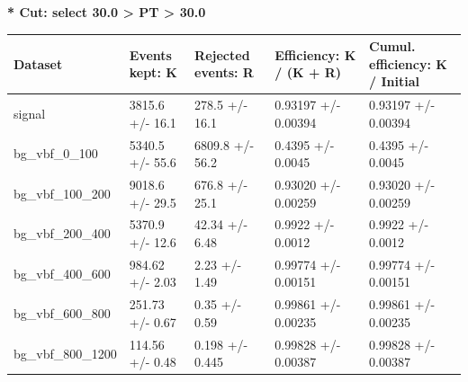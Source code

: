 \documentclass[a4paper, 10pt]{article}
\begin{document}
\textbf{* Cut: select 30.0 > PT > 30.0}\\
   \begin{table}[H]
  \begin{center}
    \begin{tabular}{|m{20.0mm}|m{27.0mm}|m{27.0mm}|m{33.0mm}|m{32.0mm}|}
      \hline
      {\cellcolor{yellow}         Dataset}& {\cellcolor{yellow}         Events kept:
          K}& {\cellcolor{yellow}         Rejected events:
          R}& {\cellcolor{yellow}         Efficiency:
          K /\- (K + R)}& {\cellcolor{yellow}         Cumul. efficiency:
          K /\- Initial}\\
      \hline
      {\cellcolor{white}         signal}& {\cellcolor{white}         3815.6 +/\-- 16.1}& {\cellcolor{white}         278.5 +/\-- 16.1}& {\cellcolor{white}         0.93197 +/\-- 0.00394}& {\cellcolor{white}         0.93197 +/\-- 0.00394}\\
      \hline
      {\cellcolor{white}         bg\_vbf\_0\_100}& {\cellcolor{white}         5340.5 +/\-- 55.6}& {\cellcolor{white}         6809.8 +/\-- 56.2}& {\cellcolor{white}         0.4395 +/\-- 0.0045}& {\cellcolor{white}         0.4395 +/\-- 0.0045}\\
      \hline
      {\cellcolor{white}         bg\_vbf\_100\_200}& {\cellcolor{white}         9018.6 +/\-- 29.5}& {\cellcolor{white}         676.8 +/\-- 25.1}& {\cellcolor{white}         0.93020 +/\-- 0.00259}& {\cellcolor{white}         0.93020 +/\-- 0.00259}\\
      \hline
      {\cellcolor{white}         bg\_vbf\_200\_400}& {\cellcolor{white}         5370.9 +/\-- 12.6}& {\cellcolor{white}         42.34 +/\-- 6.48}& {\cellcolor{white}         0.9922 +/\-- 0.0012}& {\cellcolor{white}         0.9922 +/\-- 0.0012}\\
      \hline
      {\cellcolor{white}         bg\_vbf\_400\_600}& {\cellcolor{white}         984.62 +/\-- 2.03}& {\cellcolor{white}         2.23 +/\-- 1.49}& {\cellcolor{white}         0.99774 +/\-- 0.00151}& {\cellcolor{white}         0.99774 +/\-- 0.00151}\\
      \hline
      {\cellcolor{white}         bg\_vbf\_600\_800}& {\cellcolor{white}         251.73 +/\-- 0.67}& {\cellcolor{white}         0.35 +/\-- 0.59}& {\cellcolor{white}         0.99861 +/\-- 0.00235}& {\cellcolor{white}         0.99861 +/\-- 0.00235}\\
      \hline
      {\cellcolor{white}         bg\_vbf\_800\_1200}& {\cellcolor{white}         114.56 +/\-- 0.48}& {\cellcolor{white}         0.198 +/\-- 0.445}& {\cellcolor{white}         0.99828 +/\-- 0.00387}& {\cellcolor{white}         0.99828 +/\-- 0.00387}\\

\end{tabular}
\end{center}
\end{table}
\end{document}
